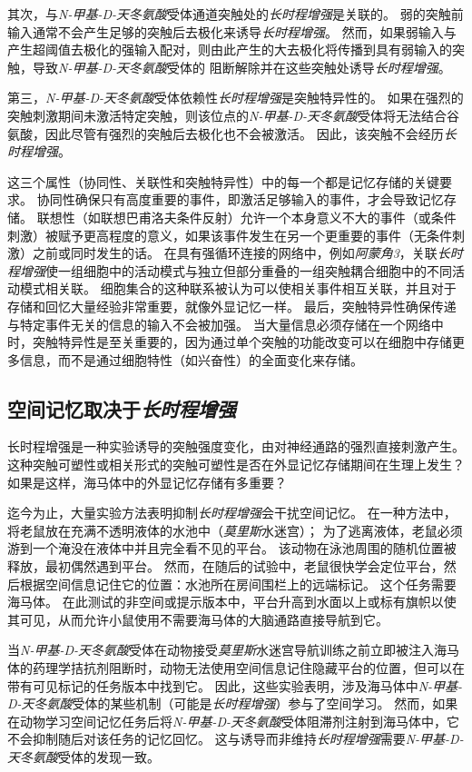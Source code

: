 其次，与\textit{N-甲基-D-天冬氨酸}受体通道突触处的\textit{长时程增强}是关联的。
弱的突触前输入通常不会产生足够的突触后去极化来诱导\textit{长时程增强}。
然而，如果弱输入与产生超阈值去极化的强输入配对，则由此产生的大去极化将传播到具有弱输入的突触，导致\textit{N-甲基-D-天冬氨酸}受体的  阻断解除并在这些突触处诱导\textit{长时程增强}。


第三，\textit{N-甲基-D-天冬氨酸}受体依赖性\textit{长时程增强}是突触特异性的。
如果在强烈的突触刺激期间未激活特定突触，则该位点的\textit{N-甲基-D-天冬氨酸}受体将无法结合谷氨酸，因此尽管有强烈的突触后去极化也不会被激活。
因此，该突触不会经历\textit{长时程增强}。


这三个属性（协同性、关联性和突触特异性）中的每一个都是记忆存储的关键要求。
协同性确保只有高度重要的事件，即激活足够输入的事件，才会导致记忆存储。
联想性（如联想巴甫洛夫条件反射）允许一个本身意义不大的事件（或条件刺激）被赋予更高程度的意义，如果该事件发生在另一个更重要的事件（无条件刺激）之前或同时发生的话。
在具有强循环连接的网络中，例如\textit{阿蒙角3}，关联\textit{长时程增强}使一组细胞中的活动模式与独立但部分重叠的一组突触耦合细胞中的不同活动模式相关联。
细胞集合的这种联系被认为可以使相关事件相互关联，并且对于存储和回忆大量经验非常重要，就像外显记忆一样。
最后，突触特异性确保传递与特定事件无关的信息的输入不会被加强。
当大量信息必须存储在一个网络中时，突触特异性是至关重要的，因为通过单个突触的功能改变可以在细胞中存储更多信息，而不是通过细胞特性（如兴奋性）的全面变化来存储。



\subsection{空间记忆取决于\textit{长时程增强}}

长时程增强是一种实验诱导的突触强度变化，由对神经通路的强烈直接刺激产生。
这种突触可塑性或相关形式的突触可塑性是否在外显记忆存储期间在生理上发生？
如果是这样，海马体中的外显记忆存储有多重要？


迄今为止，大量实验方法表明抑制\textit{长时程增强}会干扰空间记忆。
在一种方法中，将老鼠放在充满不透明液体的水池中（\textit{莫里斯}水迷宫）；
为了逃离液体，老鼠必须游到一个淹没在液体中并且完全看不见的平台。
该动物在泳池周围的随机位置被释放，最初偶然遇到平台。
然而，在随后的试验中，老鼠很快学会定位平台，然后根据空间信息记住它的位置：水池所在房间围栏上的远端标记。
这个任务需要海马体。
在此测试的非空间或提示版本中，平台升高到水面以上或标有旗帜以使其可见，从而允许小鼠使用不需要海马体的大脑通路直接导航到它。


当\textit{N-甲基-D-天冬氨酸}受体在动物接受\textit{莫里斯}水迷宫导航训练之前立即被注入海马体的药理学拮抗剂阻断时，动物无法使用空间信息记住隐藏平台的位置，但可以在带有可见标记的任务版本中找到它。
因此，这些实验表明，涉及海马体中\textit{N-甲基-D-天冬氨酸}受体的某些机制（可能是\textit{长时程增强}）参与了空间学习。
然而，如果在动物学习空间记忆任务后将\textit{N-甲基-D-天冬氨酸}受体阻滞剂注射到海马体中，它不会抑制随后对该任务的记忆回忆。
这与诱导而非维持\textit{长时程增强}需要\textit{N-甲基-D-天冬氨酸}受体的发现一致。


